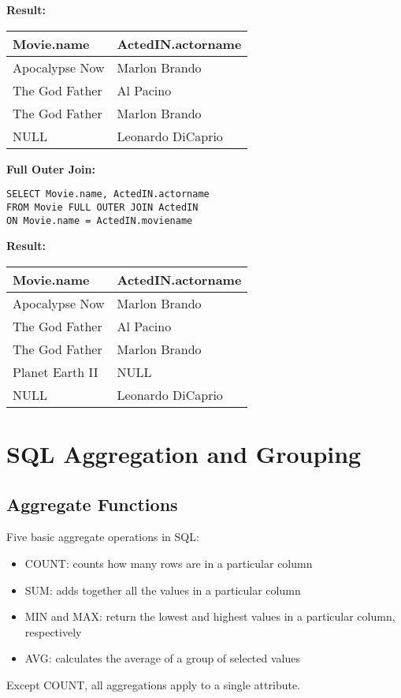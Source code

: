 \documentclass{article}
\begin{document}
\textbf{Result:}
\begin{tabular}{ll}
\hline
Movie.name & ActedIN.actorname \\
\hline
Apocalypse Now & Marlon Brando \\
The God Father & Al Pacino \\
The God Father & Marlon Brando \\
NULL & Leonardo DiCaprio \\
\hline
\end{tabular}

\textbf{Full Outer Join:}
\begin{verbatim}
SELECT Movie.name, ActedIN.actorname
FROM Movie FULL OUTER JOIN ActedIN
ON Movie.name = ActedIN.moviename
\end{verbatim}

\textbf{Result:}
\begin{tabular}{ll}
\hline
Movie.name & ActedIN.actorname \\
\hline
Apocalypse Now & Marlon Brando \\
The God Father & Al Pacino \\
The God Father & Marlon Brando \\
Planet Earth II & NULL \\
NULL & Leonardo DiCaprio \\
\hline
\end{tabular}

\section*{SQL Aggregation and Grouping}

\subsection*{Aggregate Functions}
Five basic aggregate operations in SQL:
\begin{itemize}
    \item COUNT: counts how many rows are in a particular column
    \item SUM: adds together all the values in a particular column
    \item MIN and MAX: return the lowest and highest values in a particular column, respectively
    \item AVG: calculates the average of a group of selected values
\end{itemize}

Except COUNT, all aggregations apply to a single attribute.
\end{document}
